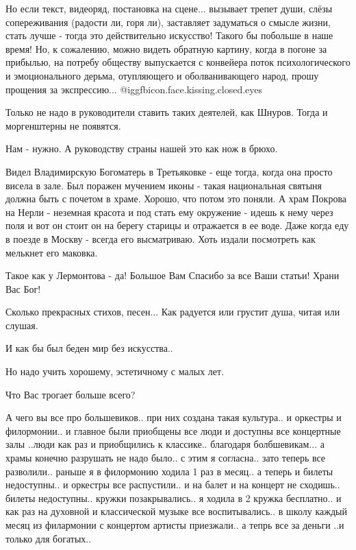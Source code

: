 \begin{itemize}
Но если текст, видеоряд, постановка на сцене... вызывает трепет души, слёзы
сопереживания (радости ли, горя ли), заставляет задуматься о смысле жизни,
стать лучше - тогда это действительно искусство! Такого бы побольше в наше
время! Но, к сожалению, можно видеть обратную картину, когда в погоне за
прибылью, на потребу обществу выпускается с конвейера поток психологического и
эмоционального дерьма, отупляющего и оболванивающего народ, прошу прощения за
экспрессию... @igg{fbicon.face.kissing.closed.eyes} 


Только не надо в руководители ставить таких деятелей, как Шнуров. Тогда и моргенштерны не появятся.


Нам - нужно. А руководству страны нашей это как нож в брюхо.


Видел Владимирскую Богоматерь в Третьяковке - еще тогда, когда она просто
висела в зале. Был поражен мучением иконы - такая национальная святыня должна
быть с почетом в храме. Хорошо, что потом это поняли. А храм Покрова на Нерли -
неземная красота и под стать ему окружение - идешь к нему через поля и вот он
стоит он на берегу старицы и отражается в ее воде. Даже когда еду в поезде в
Москву - всегда его высматриваю. Хоть издали посмотреть как мелькнет его
маковка.


Такое как у Лермонтова - да! Большое Вам Спасибо за все Ваши статьи! Храни Вас Бог!

Сколько прекрасных стихов, песен... Как радуется или грустит душа, читая или
слушая.

И как бы был беден мир без искусства..

Но надо учить хорошему, эстетичному с малых лет.


Что Вас трогает больше всего?

А чего вы все про большевиков.. при них создана такая культура.. и оркестры и
филормонии.. и главное были приобщены все люди и доступны все концертные залы
..люди как раз и приобщились к классике.. благодаря болбшевикам... а храмы
конечно разрушать не надо было.. с этим я согласна.. зато теперь все
разволили.. раньше я в филормонию ходила 1 раз в месяц.. а теперь и билеты
недоступны.. и оркестры все распустили.. и на балет и на концерт не
сходишь.. билеты недоступны.. кружки позакрывались.. я ходила в 2 кружка
бесплатно.. и как раз на духовной и классической музыке все воспитывались.. в
школу каждый месяц из филармонии с концертом артисты приезжали.. а тепрь все за
деньги ..и только для богатых..


\end{itemize}
